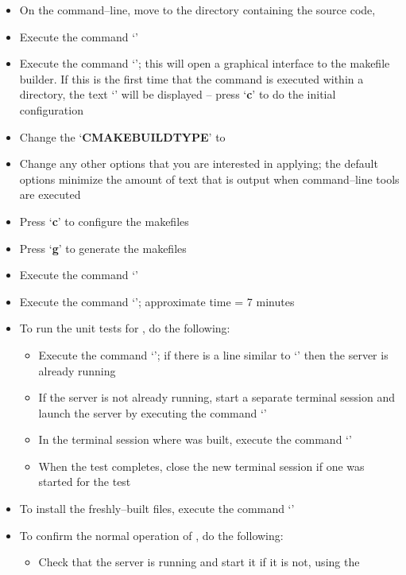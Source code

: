 \begin{itemize}
\item On the command--line, move to the directory containing the \mplusm{} source code,
\item Execute the command `'
\item Execute the command `'; this will open a graphical interface to the
makefile builder. If this is the first time that the command is executed within a
directory, the text `' will be displayed -- press `\textbf{c}' to do
the initial configuration
\item Change the `\textbf{CMAKE\fUS{}BUILD\fUS{}TYPE}' to 
\item Change any other options that you are interested in applying; the default options
minimize the amount of text that is output when \mplusm{} command--line tools are
executed
\item Press `\textbf{c}' to configure the makefiles
\item Press `\textbf{g}' to generate the makefiles
\item Execute the command `'
\item Execute the command `'; approximate time = 7 minutes
\item To run the unit tests for \mplusm{}, do the following:
\begin{itemize}
\item Execute the command `'; if there is a line
similar to `' then the \yarp{}
server is already running
\item If the \yarp{} server is not already running, start a separate terminal session and
launch the \yarp{} server by executing the command `'
\item In the terminal session where \mplusm{} was built, execute the command
`'
\item When the test completes, close the new terminal session if one was started for the
test
\end{itemize}
\item To install the freshly--built \mplusm{} files, execute the command
`'
\item To confirm the normal operation of \mplusm{}, do the following:
\begin{itemize}
\item Check that the \yarp{} server is running and start it if it is not, using the

\end{itemize}
\end{itemize}
